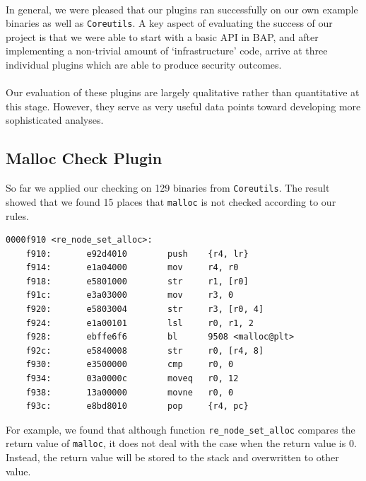 \documentclass[letterpaper,11pt]{article}
\begin{document}
\paragraph{}
In general, we were pleased that our plugins ran successfully on our own
example binaries as well as \texttt{Coreutils}. A key aspect of evaluating
the success of our project is that we were able to start with a basic API in
BAP, and after implementing a non-trivial amount of `infrastructure' code,
arrive at three individual plugins which are able to produce security outcomes.

\paragraph{}
Our evaluation of these plugins are largely qualitative rather than
quantitative at this stage. However, they serve as very useful data points
toward developing more sophisticated analyses.

\subsection{Malloc Check Plugin}
So far we applied our checking on 129 binaries from \texttt{Coreutils}. The
result showed that we found 15 places that \texttt{malloc} is not checked
according to our rules.
\begin{center}
\lstset{language=C, label=strcpy_asm,
caption=Function re\_node\_set\_alloc, breaklines=true, basicstyle=\tiny, numbers=none}
\begin{lstlisting}
0000f910 <re_node_set_alloc>:
    f910:       e92d4010        push    {r4, lr}
    f914:       e1a04000        mov     r4, r0
    f918:       e5801000        str     r1, [r0]
    f91c:       e3a03000        mov     r3, 0
    f920:       e5803004        str     r3, [r0, 4]
    f924:       e1a00101        lsl     r0, r1, 2
    f928:       ebffe6f6        bl      9508 <malloc@plt>
    f92c:       e5840008        str     r0, [r4, 8]
    f930:       e3500000        cmp     r0, 0
    f934:       03a0000c        moveq   r0, 12
    f938:       13a00000        movne   r0, 0
    f93c:       e8bd8010        pop     {r4, pc}
\end{lstlisting}
\end{center}
For example, we found that although function \texttt{re\_node\_set\_alloc}
compares the return value of \texttt{malloc}, it does not deal with the case
when the return value is 0. Instead, the return value will be stored to the
stack and overwritten to other value.
\end{document}
